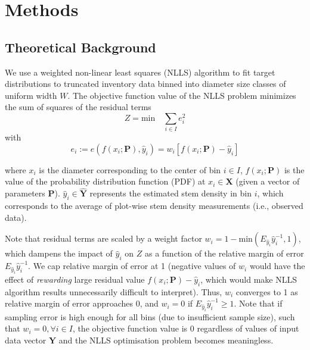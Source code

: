 \documentclass{article}
\begin{document}
  \section{Methods}
  \label{sec:methods}

  \subsection{Theoretical Background}
  \label{sec:methods_background}
  
  We use a weighted non-linear least squares (NLLS) algorithm to fit target distributions to truncated inventory data binned into diameter size classes of uniform width $W$.
  The objective function value of the NLLS problem minimizes the sum of squares of the residual terms
\begin{equation}
Z = \text{min} \quad \sum_{i \in I} e_i^2
\end{equation}
    with
  \begin{equation}
    e_i := e\left(f(x_i; \bm{P}), \hat{y}_i\right) = w_i \left[f(x_i; \bm{P}) - \hat{y}_i\right] 
  \end{equation}
  
  where $x_i$ is the diameter corresponding to the center of bin $i \in I$, $f(x_i; \bm{P})$ is the value of the probability distribution function (PDF) at $x_i \in \bm{X}$ (given a vector of parameters $\bm{P}$). $\hat{y}_i \in \bm{\hat{Y}}$ represents the estimated stem density in bin $i$, which corresponds to the average of plot-wise stem density measurements (i.e., observed data).
  
  Note that residual terms are scaled by a weight factor $w_i = 1 - \text{min}(E_{\hat{y}_i}\hat{y}_i^{-1}, 1)$, which dampens the impact of $\hat{y}_i$ on $Z$ as a function of the relative margin of error $E_{\hat{y}_i}\hat{y}_i^{-1}$. We cap relative margin of error at 1 (negative values of $w_i$ would have the effect of \emph{rewarding} large residual value $f(x_i; \bm{P}) - \hat{y}_i$, which would make NLLS algorithm results unnecessarily difficult to interpret).  
  Thus, $w_i$ converges to 1 as relative margin of error approaches 0, and $w_i = 0$ if $E_{\hat{y}_i}\hat{y}_i^{-1} \geq 1$. 
  Note that if sampling error is high enough for all bins (due to insufficient sample size), such that  $w_i = 0, \forall i \in I$, the objective function value is 0 regardless of values of input data vector $\bm{\hat{Y}}$ and the NLLS optimisation problem becomes meaningless.
\end{document}

